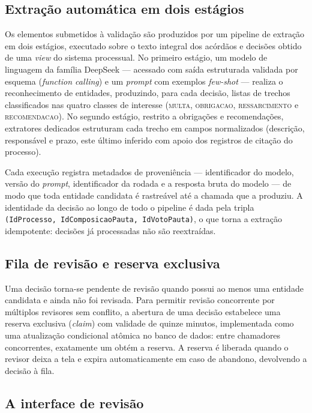 \subsection{Extração automática em dois estágios}
\label{subsec:validacao-extracao}

Os elementos submetidos à validação são produzidos por um pipeline de extração
em dois estágios, executado sobre o texto integral dos acórdãos e decisões
obtido de uma \emph{view} do sistema processual. No primeiro estágio, um
modelo de linguagem da família DeepSeek \cite{deepseekai2024v3} --- acessado
com saída estruturada validada por esquema (\emph{function calling}) e um
\emph{prompt} com exemplos \emph{few-shot} \cite{brown2020language} ---
realiza o reconhecimento de entidades, produzindo, para cada decisão, listas
de trechos classificados nas quatro classes de interesse
(\textsc{multa}, \textsc{obrigacao}, \textsc{ressarcimento} e
\textsc{recomendacao}). No segundo estágio, restrito a obrigações e
recomendações, extratores dedicados estruturam cada trecho em campos
normalizados (descrição, responsável e prazo, este último inferido com apoio
dos registros de citação do processo).

Cada execução registra metadados de proveniência --- identificador do modelo,
versão do \emph{prompt}, identificador da rodada e a resposta bruta do modelo
--- de modo que toda entidade candidata é rastreável até a chamada que a
produziu. A identidade da decisão ao longo de todo o pipeline é dada pela
tripla \texttt{(IdProcesso, IdComposicaoPauta, IdVotoPauta)}, o que torna a
extração idempotente: decisões já processadas não são reextraídas.

\subsection{Fila de revisão e reserva exclusiva}
\label{subsec:validacao-fila}

Uma decisão torna-se pendente de revisão quando possui ao menos uma entidade
candidata e ainda não foi revisada. Para permitir revisão concorrente por
múltiplos revisores sem conflito, a abertura de uma decisão estabelece uma
reserva exclusiva (\emph{claim}) com validade de quinze minutos, implementada
como uma atualização condicional atômica no banco de dados: entre chamadores
concorrentes, exatamente um obtém a reserva. A reserva é liberada quando o
revisor deixa a tela e expira automaticamente em caso de abandono, devolvendo
a decisão à fila.

\subsection{A interface de revisão}
\label{subsec:validacao-interface}

